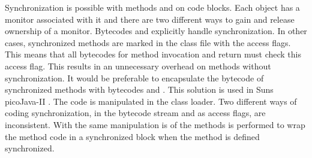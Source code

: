 Synchronization is possible with methods and on code blocks. Each
object has a monitor associated with it and there are two different
ways to gain and release ownership of a monitor. Bytecodes
 and  explicitly handle
synchronization. In other cases, synchronized methods are marked in
the class file with the access flags. This means that all bytecodes
for method invocation and return must check this access flag. This
results in an unnecessary overhead on methods without
synchronization. It would be preferable to encapsulate the bytecode
of synchronized methods with bytecodes  and
. This solution is used in Suns picoJava-II
\cite{pjProgRef}. The code is manipulated in the class loader. Two
different ways of coding synchronization, in the bytecode stream and
as access flags, are inconsistent. With  the same
manipulation is of the methods is performed to wrap the method code
in a synchronized block when the method is defined synchronized.
